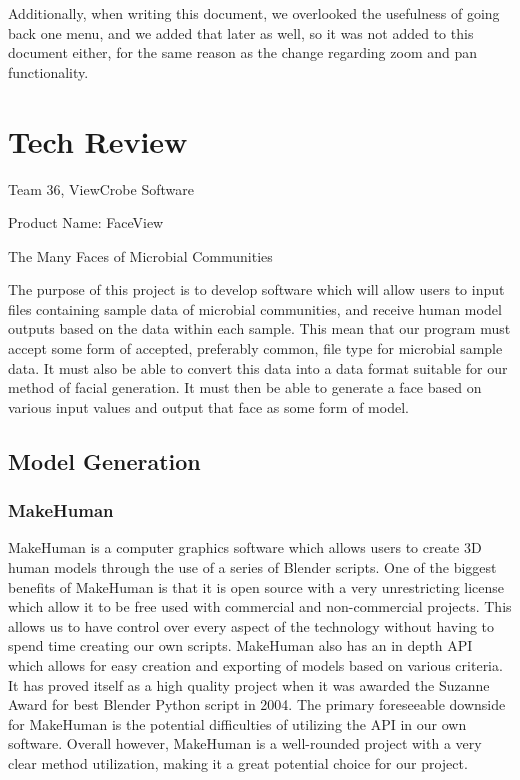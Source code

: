 \documentclass[letterpaper,10pt, onecolumn, draftclsnofoot]{IEEEtran}
\begin{document}
Additionally, when writing this document, we overlooked the usefulness of going back one menu, and we added that later as well, so it was not added to this document either, for the same reason as the change regarding zoom and pan functionality.


\section{Tech Review}
Team 36, ViewCrobe Software

Product Name: FaceView

The Many Faces of Microbial Communities

The purpose of this project is to develop software which will allow users to input files containing sample data of microbial communities, and receive human model outputs based on the data within each sample. This mean that our program must accept some form of accepted, preferably common, file type for microbial sample data. It must also be able to convert this data into a data format suitable for our method of facial generation. It must then be able to generate a face based on various input values and output that face as some form of model. 

\subsection{Model Generation}
\subsubsection{MakeHuman}
MakeHuman is a computer graphics software which allows users to create 3D human models through the use of a series of Blender scripts. One of the biggest benefits of MakeHuman is that it is open source with a very unrestricting license which allow it to be free used with commercial and non-commercial projects. This allows us to have control over every aspect of the technology without having to spend time creating our own scripts. MakeHuman also has an in depth API which allows for easy creation and exporting of models based on various criteria. It has proved itself as a high quality project when it was awarded the Suzanne Award for best Blender Python script in 2004. The primary foreseeable downside for MakeHuman is the potential difficulties of utilizing the API in our own software. Overall however, MakeHuman is a well-rounded project with a very clear method utilization, making it a great potential choice for our project.
\end{document}
